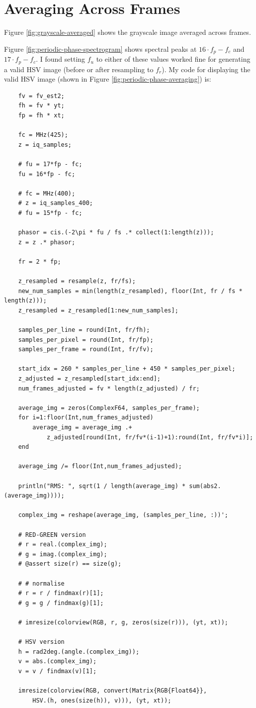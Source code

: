\documentclass{article}
\begin{document}
\section*{Averaging Across Frames}

Figure \ref{fig:grayscale-averaged} shows the grayscale image averaged across frames.

Figure \ref{fig:periodic-phase-spectrogram} shows spectral peaks at $16 \cdot f_p - f_c$ and $17 \cdot f_p - f_c$. I found setting $f_u$ to either of these values worked fine for generating a valid HSV image (before or after resampling to $f_r$). My code for displaying the valid HSV image (shown in Figure \ref{fig:periodic-phase-averaging}) is:

\begin{verbatim}
    fv = fv_est2;
    fh = fv * yt;
    fp = fh * xt;

    fc = MHz(425);
    z = iq_samples;

    # fu = 17*fp - fc;
    fu = 16*fp - fc;

    # fc = MHz(400);
    # z = iq_samples_400;
    # fu = 15*fp - fc;

    phasor = cis.(-2\pi * fu / fs .* collect(1:length(z)));
    z = z .* phasor;

    fr = 2 * fp;

    z_resampled = resample(z, fr/fs);
    new_num_samples = min(length(z_resampled), floor(Int, fr / fs * length(z)));
    z_resampled = z_resampled[1:new_num_samples];

    samples_per_line = round(Int, fr/fh);
    samples_per_pixel = round(Int, fr/fp);
    samples_per_frame = round(Int, fr/fv);

    start_idx = 260 * samples_per_line + 450 * samples_per_pixel;
    z_adjusted = z_resampled[start_idx:end];
    num_frames_adjusted = fv * length(z_adjusted) / fr;

    average_img = zeros(ComplexF64, samples_per_frame);
    for i=1:floor(Int,num_frames_adjusted)
        average_img = average_img .+
            z_adjusted[round(Int, fr/fv*(i-1)+1):round(Int, fr/fv*i)];
    end

    average_img /= floor(Int,num_frames_adjusted);

    println("RMS: ", sqrt(1 / length(average_img) * sum(abs2.(average_img))));

    complex_img = reshape(average_img, (samples_per_line, :))';

    # RED-GREEN version
    # r = real.(complex_img);
    # g = imag.(complex_img);
    # @assert size(r) == size(g);

    # # normalise
    # r = r / findmax(r)[1];
    # g = g / findmax(g)[1];

    # imresize(colorview(RGB, r, g, zeros(size(r))), (yt, xt));

    # HSV version
    h = rad2deg.(angle.(complex_img));
    v = abs.(complex_img);
    v = v / findmax(v)[1];

    imresize(colorview(RGB, convert(Matrix{RGB{Float64}},
        HSV.(h, ones(size(h)), v))), (yt, xt));
\end{verbatim}
\end{document}
